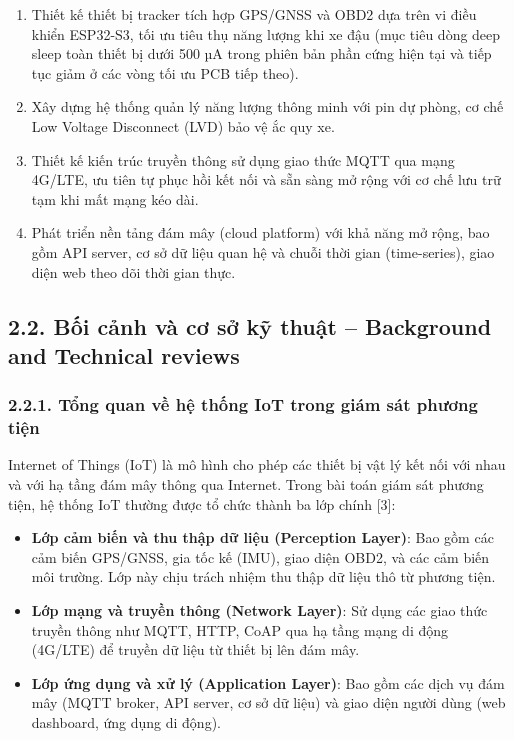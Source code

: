 \documentclass[13pt,a4paper]{extarticle}
\renewcommand{\\}{\thesislongtableorignewline\hline}%
\providecommand{\tightlist}{%
  \setlength{\itemsep}{0pt}\setlength{\parskip}{0pt}}
\begin{document}
\begin{enumerate}
\def\labelenumi{\arabic{enumi}.}
\tightlist
\item
  Thiết kế thiết bị tracker tích hợp GPS/GNSS và OBD2 dựa trên vi điều
  khiển ESP32-S3, tối ưu tiêu thụ năng lượng khi xe đậu (mục tiêu dòng
  deep sleep toàn thiết bị dưới 500 µA trong phiên bản phần cứng hiện
  tại và tiếp tục giảm ở các vòng tối ưu PCB tiếp theo).
\item
  Xây dựng hệ thống quản lý năng lượng thông minh với pin dự phòng, cơ
  chế Low Voltage Disconnect (LVD) bảo vệ ắc quy xe.
\item
  Thiết kế kiến trúc truyền thông sử dụng giao thức MQTT qua mạng
  4G/LTE, ưu tiên tự phục hồi kết nối và sẵn sàng mở rộng với cơ chế lưu
  trữ tạm khi mất mạng kéo dài.
\item
  Phát triển nền tảng đám mây (cloud platform) với khả năng mở rộng, bao
  gồm API server, cơ sở dữ liệu quan hệ và chuỗi thời gian
  (time-series), giao diện web theo dõi thời gian thực.
\end{enumerate}

\subsection{2.2. Bối cảnh và cơ sở kỹ thuật -- Background and Technical
reviews}\label{22-bux1ed1i-cux1ea3nh-vuxe0-cux1a1-sux1edf-kux1ef9-thuux1eadt--background-and-technical-reviews}

\subsubsection{2.2.1. Tổng quan về hệ thống IoT trong giám sát phương
tiện}\label{221-tux1ed5ng-quan-vux1ec1-hux1ec7-thux1ed1ng-iot-trong-giuxe1m-suxe1t-phux1b0ux1a1ng-tiux1ec7n}

Internet of Things (IoT) là mô hình cho phép các thiết bị vật lý kết nối
với nhau và với hạ tầng đám mây thông qua Internet. Trong bài toán giám
sát phương tiện, hệ thống IoT thường được tổ chức thành ba lớp chính
{[}3{]}:

\begin{itemize}
\tightlist
\item
  \textbf{Lớp cảm biến và thu thập dữ liệu (Perception Layer)}: Bao gồm
  các cảm biến GPS/GNSS, gia tốc kế (IMU), giao diện OBD2, và các cảm
  biến môi trường. Lớp này chịu trách nhiệm thu thập dữ liệu thô từ
  phương tiện.
\item
  \textbf{Lớp mạng và truyền thông (Network Layer)}: Sử dụng các giao
  thức truyền thông như MQTT, HTTP, CoAP qua hạ tầng mạng di động
  (4G/LTE) để truyền dữ liệu từ thiết bị lên đám mây.
\item
  \textbf{Lớp ứng dụng và xử lý (Application Layer)}: Bao gồm các dịch
  vụ đám mây (MQTT broker, API server, cơ sở dữ liệu) và giao diện người
  dùng (web dashboard, ứng dụng di động).
\end{itemize}
\end{document}

